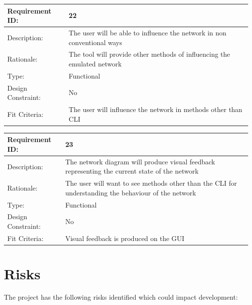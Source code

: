 \documentclass[11pt]{report}
\begin{document}
\newline
\vspace*{0.5 cm}
\newline
\begin{tabular}{|l|p{12cm}|}
	\hline Requirement ID: & 22 \\ 
	\hline Description: & The user will be able to influence the network in non conventional ways \\ 
	\hline Rationale: & The tool will provide other methods of influencing the emulated network \\ 
	\hline Type: & Functional \\ 
	\hline Design Constraint: & No \\ 
	\hline Fit Criteria: & The user will influence the network in methods other than CLI  \\ 
	\hline 
\end{tabular}
\newline
\vspace*{0.5 cm}
\newline
\begin{tabular}{|l|p{12cm}|}
	\hline Requirement ID: & 23 \\ 
	\hline Description: & The network diagram will produce visual feedback representing the current state of the network \\ 
	\hline Rationale: & The user will want to see methods other than the CLI for understanding the behaviour of the network \\ 
	\hline Type: & Functional \\ 
	\hline Design Constraint: & No \\ 
	\hline Fit Criteria: & Visual feedback is produced on the GUI  \\ 
	\hline 
\end{tabular}
\newline
\vspace*{0.5 cm}
\newline

\section{Risks}

The project has the following risks identified which could impact development:
\end{document}
